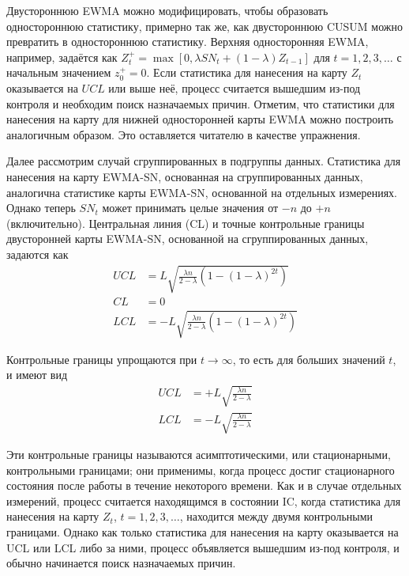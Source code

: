 Двустороннюю EWMA можно модифицировать, чтобы образовать одностороннюю статистику, примерно так же, как двустороннюю CUSUM можно превратить в одностороннюю статистику. Верхняя односторонняя EWMA, например, задаётся как \(Z_t^+ = \max[0, \lambda SN_t + (1 - \lambda)Z_{t-1}]\) для \(t = 1, 2, 3, \ldots\) с начальным значением \(z_0^+ = 0\). Если статистика для нанесения на карту \(Z_t\) оказывается на \(UCL\) или выше неё, процесс считается вышедшим из-под контроля и необходим поиск назначаемых причин. Отметим, что статистики для нанесения на карту для нижней односторонней карты EWMA можно построить аналогичным образом. Это оставляется читателю в качестве упражнения.

Далее рассмотрим случай сгруппированных в подгруппы данных. Статистика для нанесения на карту EWMA-SN, основанная на сгруппированных данных, аналогична статистике карты EWMA-SN, основанной на отдельных измерениях. Однако теперь \(SN_t\) может принимать целые значения от \(-n\) до \(+n\) (включительно). Центральная линия (CL) и точные контрольные границы двусторонней карты EWMA-SN, основанной на сгруппированных данных, задаются как
\begin{equation}
	\begin{aligned}
		UCL &= L\sqrt{\frac{\lambda n}{2 - \lambda} \left(1 - (1 - \lambda)^{2t}\right)} \\
		CL &= 0 \\
		LCL &= -L\sqrt{\frac{\lambda n}{2 - \lambda} \left(1 - (1 - \lambda)^{2t}\right)}
	\end{aligned}
	\label{eq:4.16}
\end{equation}

Контрольные границы упрощаются при \(t \to \infty\), то есть для больших значений \(t\), и имеют вид
\begin{equation}
	\begin{aligned}
		UCL &= +L\sqrt{\frac{\lambda n}{2 - \lambda}} \\
		LCL &= -L\sqrt{\frac{\lambda n}{2 - \lambda}}
	\end{aligned}
	\label{eq:4.17}
\end{equation}

Эти контрольные границы называются асимптотическими, или стационарными, контрольными границами; они применимы, когда процесс достиг стационарного состояния после работы в течение некоторого времени. Как и в случае отдельных измерений, процесс считается находящимся в состоянии IC, когда статистика для нанесения на карту \(Z_t\), \(t = 1, 2, 3, \ldots\), находится между двумя контрольными границами. Однако как только статистика для нанесения на карту оказывается на UCL или LCL либо за ними, процесс объявляется вышедшим из-под контроля, и обычно начинается поиск назначаемых причин.

